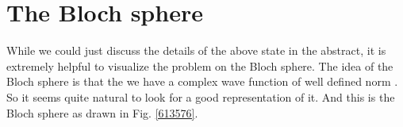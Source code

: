\section{The Bloch sphere}

While we could just discuss the details of the above state in the abstract, it is extremely helpful to visualize the problem on the Bloch sphere. The idea of the Bloch sphere is that the we have a complex wave function of well defined norm . So it seems quite natural to look for a good representation of it. And this is the Bloch sphere as drawn in Fig. \ref{613576}. 